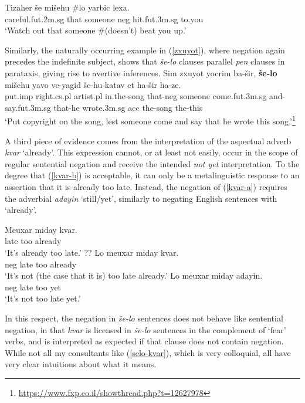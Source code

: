 \documentclass[output=paper,colorlinks,citecolor=brown]{langscibook}
\begin{document}
\ea
\label{tizaher}
\gll Tizaher še mišehu \#{\op}lo{\cp} yarbic lexa. \\
careful.{\sc fut.2m.sg} that someone {\sc neg} hit.{\sc fut.3m.sg} to.you \\
\glt `Watch out that someone \#(doesn't) beat you up.'
\z

Similarly, the naturally occurring example in  (\ref{zxuyot}), where negation again precedes the indefinite subject, shows that \textit{še-lo} clauses parallel \textit{pen} clauses in parataxis, giving rise to avertive inferences.
\ea
\label{zxuyot}
\gll Sim zxuyot yocrim ba-šir, \textbf{še-lo} mišehu yavo ve-yagid še-hu katav et ha-šir ha-ze. \\
put.{\sc imp} right.{\sc cs.pl} artist.{\sc pl} in.the-song that-{\sc neg} someone come.{\sc fut.3m.sg} and-say.{\sc fut.3m.sg} that-he wrote.{\sc 3m.sg} {\sc acc} the-song the-this  \\
\glt `Put copyright on the song, lest someone come and say that he wrote this song.'\footnote{\url{https://www.fxp.co.il/showthread.php?t=12627978}}
\z

A third piece of evidence comes from the interpretation of the aspectual adverb  \textit{kvar} `already'. This expression cannot, or at least not easily, occur in the scope of regular sentential negation and receive the intended \textit{not yet} interpretation. To the degree that (\ref{kvar-b}) is acceptable, it can only be a metalinguistic response to an assertion that it is already too late. Instead, the negation of (\ref{kvar-a}) requires the adverbial \textit{adayin} `still/yet', similarly to negating English sentences with `already'. 

\ea
\label{kvar}
\begin{xlist}
\ex \label{kvar-a}
\gll Meuxar miday kvar. \\
 late too already \\

\glt `It's already too late.'
\ex \label{kvar-b}
\gll ?? Lo meuxar miday kvar. \\
{\phantom{??}} {\sc neg} late too already \\

\glt `It's not (the case that it is) too late already.'
\ex
\gll Lo meuxar miday adayin. \\
 {\sc neg} late too yet \\
\glt `It's not too late yet.'
\end{xlist}
\z

In this respect, the negation in \textit{še-lo} sentences does not behave like sentential negation, in that \textit{kvar} is licensed in \textit{še-lo} sentences in the complement of `fear' verbs, and is interpreted as expected if that clause does not contain negation. While not all my consultants like (\ref{selo-kvar}), which is very colloquial, all have very clear intuitions about what it means.
\end{document}

